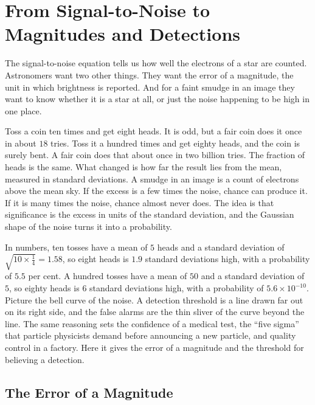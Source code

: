 \section{From Signal-to-Noise to Magnitudes and Detections}
\label{cc:sec:detection}

The signal-to-noise equation tells us how well the electrons of a star are counted. Astronomers want two other things. They want the error of a magnitude, the unit in which brightness is reported. And for a faint smudge in an image they want to know whether it is a star at all, or just the noise happening to be high in one place.

Toss a coin ten times and get eight heads. It is odd, but a fair coin does it once in about $18$ tries. Toss it a hundred times and get eighty heads, and the coin is surely bent. A fair coin does that about once in two billion tries. The fraction of heads is the same. What changed is how far the result lies from the mean, measured in standard deviations. A smudge in an image is a count of electrons above the mean sky. If the excess is a few times the noise, chance can produce it. If it is many times the noise, chance almost never does. The idea is that significance is the excess in units of the standard deviation, and the Gaussian shape of the noise turns it into a probability.

In numbers, ten tosses have a mean of $5$ heads and a standard deviation of $\sqrt{10\times\tfrac14}=1.58$, so eight heads is $1.9$ standard deviations high, with a probability of $5.5$ per cent. A hundred tosses have a mean of $50$ and a standard deviation of $5$, so eighty heads is $6$ standard deviations high, with a probability of $5.6\times10^{-10}$. Picture the bell curve of the noise. A detection threshold is a line drawn far out on its right side, and the false alarms are the thin sliver of the curve beyond the line. The same reasoning sets the confidence of a medical test, the ``five sigma'' that particle physicists demand before announcing a new particle, and quality control in a factory. Here it gives the error of a magnitude and the threshold for believing a detection.

\subsection{The Error of a Magnitude}


